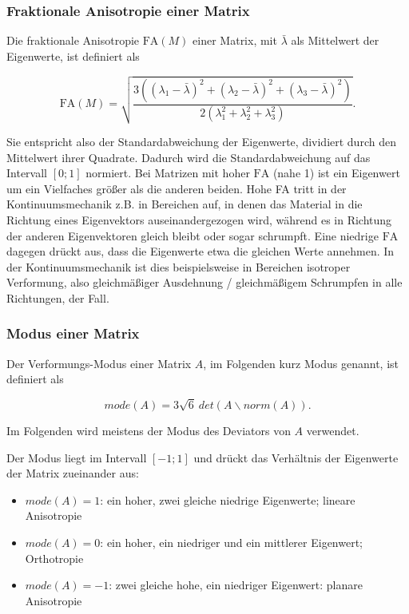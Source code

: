 \documentclass[a4paper,fontsize=12pt,toc=bib,parskip=half,ngerman]{scrartcl}
\begin{document}
\subsubsection{Fraktionale Anisotropie einer Matrix}
Die fraktionale Anisotropie $\text{FA}(M)$ einer Matrix, mit $\bar{\lambda}$ als Mittelwert der Eigenwerte, ist definiert als

\begin{equation}
	\text{FA}(M) = \sqrt{\frac{3((\lambda_1 - \bar{\lambda})^2 + (\lambda_2 - \bar{\lambda})^2 + (\lambda_3 - \bar{\lambda})^2)}{2(\lambda_1^2 + \lambda_2^2 + \lambda_3^2)}}.
\end{equation}

Sie entspricht also der Standardabweichung der Eigenwerte, dividiert durch den Mittelwert ihrer Quadrate. Dadurch wird die Standardabweichung auf das Intervall $[0;1]$ normiert. Bei Matrizen mit hoher $\text{FA}$ (nahe 1) ist ein Eigenwert um ein Vielfaches gr\"o{\ss}er als die anderen beiden. Hohe FA tritt in der Kontinuumsmechanik z.B. in Bereichen auf, in denen das Material in die Richtung eines Eigenvektors auseinandergezogen wird, w\"ahrend es in Richtung der anderen Eigenvektoren gleich bleibt oder sogar schrumpft. Eine niedrige $\text{FA}$ dagegen dr\"uckt aus, dass die Eigenwerte etwa die gleichen Werte annehmen. In der Kontinuumsmechanik ist dies beispielsweise in Bereichen isotroper Verformung, also gleichm\"a{\ss}iger Ausdehnung / gleichm\"a{\ss}igem Schrumpfen in alle Richtungen, der Fall.

\subsubsection{Modus einer Matrix}
Der Verformungs-Modus \cite{criscione2000invariant} einer Matrix $A$, im Folgenden kurz Modus genannt, ist definiert als

\begin{equation}
	mode(A) = 3\sqrt{6}~det(A\backslash norm(A)).
\end{equation}

Im Folgenden wird meistens der Modus des Deviators von $A$ verwendet.

Der Modus liegt im Intervall $[-1;1]$ und dr\"uckt das Verh\"altnis der Eigenwerte der Matrix zueinander aus:

\begin{itemize}
	\item $mode(A) = 1$: ein hoher, zwei gleiche niedrige Eigenwerte; lineare Anisotropie
	\item $mode(A) = 0$: ein hoher, ein niedriger und ein mittlerer Eigenwert; Orthotropie
	\item $mode(A) = -1$: zwei gleiche hohe, ein niedriger Eigenwert: planare Anisotropie
\end{itemize} 
\end{document}
